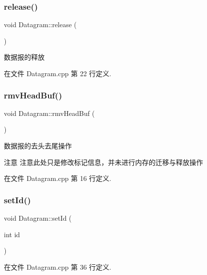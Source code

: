 \subsubsection{\texorpdfstring{release()}{release()}}
{\footnotesize\ttfamily void Datagram\+::release (\begin{DoxyParamCaption}{ }\end{DoxyParamCaption})}



数据报的释放 



在文件 Datagram.\+cpp 第 22 行定义.

\mbox{\label{class_datagram_a92f5c858fa5f872bc7576346b932f77a}} 
\subsubsection{\texorpdfstring{rmv\+Head\+Buf()}{rmvHeadBuf()}}
{\footnotesize\ttfamily void Datagram\+::rmv\+Head\+Buf (\begin{DoxyParamCaption}{ }\end{DoxyParamCaption})}



数据报的去头去尾操作 

\begin{DoxyAttention}{注意}
注意此处只是修改标记信息，并未进行内存的迁移与释放操作 
\end{DoxyAttention}


在文件 Datagram.\+cpp 第 16 行定义.

\mbox{\label{class_datagram_a396a4dba1b8d973ce0d8951ca885872c}} 
\subsubsection{\texorpdfstring{set\+Id()}{setId()}}
{\footnotesize\ttfamily void Datagram\+::set\+Id (\begin{DoxyParamCaption}\item[{int}]{id }\end{DoxyParamCaption})}



在文件 Datagram.\+cpp 第 36 行定义.



